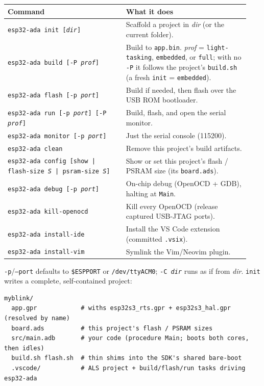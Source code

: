 \begin{longtable}{p{0.46\linewidth} p{0.48\linewidth}}
\toprule
\textbf{Command} & \textbf{What it does} \\ \midrule
\endhead
\texttt{esp32-ada init [\textit{dir}]} & Scaffold a project in \textit{dir} (or the current folder). \\
\texttt{esp32-ada build [-P \textit{prof}]} & Build to \texttt{app.bin}. \textit{prof} = \texttt{light-tasking}, \texttt{embedded}, or \texttt{full}; with no \texttt{-P} it follows the project's \texttt{build.sh} (a fresh \texttt{init} = \texttt{embedded}). \\
\texttt{esp32-ada flash [-p \textit{port}]} & Build if needed, then flash over the USB ROM bootloader. \\
\texttt{esp32-ada run [-p \textit{port}] [-P \textit{prof}]} & Build, flash, and open the serial monitor. \\
\texttt{esp32-ada monitor [-p \textit{port}]} & Just the serial console (115200). \\
\texttt{esp32-ada clean} & Remove this project's build artifacts. \\
\texttt{esp32-ada config [show | flash-size \textit{S} | psram-size \textit{S}]} & Show or set this project's flash / PSRAM size (its \texttt{board.ads}). \\
\texttt{esp32-ada debug [-p \textit{port}]} & On-chip debug (OpenOCD + GDB), halting at \texttt{Main}. \\
\texttt{esp32-ada kill-openocd} & Kill every OpenOCD (release captured USB-JTAG ports). \\
\texttt{esp32-ada install-ide} & Install the VS Code extension (committed \texttt{.vsix}). \\
\texttt{esp32-ada install-vim} & Symlink the Vim/Neovim plugin. \\ \midrule
\bottomrule
\end{longtable}

\noindent\texttt{-p}/\texttt{--port} defaults to \texttt{\$ESPPORT} or
\texttt{/dev/ttyACM0}; \texttt{-C \textit{dir}} runs as if from \textit{dir}.
\texttt{init} writes a complete, self-contained project:

\begin{lstlisting}[style=sh]
myblink/
  app.gpr            # withs esp32s3_rts.gpr + esp32s3_hal.gpr (resolved by name)
  board.ads          # this project's flash / PSRAM sizes
  src/main.adb       # your code (procedure Main; boots both cores, then idles)
  build.sh flash.sh  # thin shims into the SDK's shared bare-boot
  .vscode/           # ALS project + build/flash/run tasks driving esp32-ada
\end{lstlisting}

